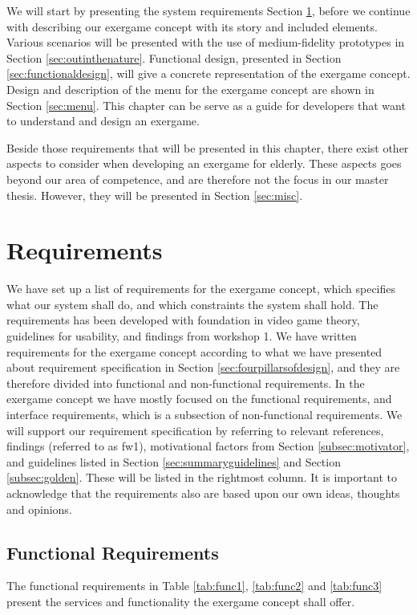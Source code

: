 We will start by presenting the system requirements Section \ref{sec:req}, before we continue with describing our exergame concept with its story and included elements. Various scenarios will be presented with the use of medium-fidelity prototypes in Section \ref{sec:outinthenature}. Functional design, presented in Section \ref{sec:functionaldesign}, will give a concrete representation of the exergame concept. Design and description of the menu for the exergame concept are shown in Section \ref{sec:menu}. This chapter can be serve as a guide for developers that want to understand and design an exergame. 

Beside those requirements that will be presented in this chapter, there exist other aspects to consider when developing an exergame for elderly. These aspects goes beyond our area of competence, and are therefore not the focus in our master thesis. However, they will be presented in Section \ref{sec:misc}.

\section{Requirements}
\label{sec:req}
We have set up a list of requirements for the exergame concept, which specifies what our system shall do, and which constraints the system shall hold. The requirements has been developed with foundation in video game theory, guidelines for usability, and findings from workshop 1. We have written requirements for the exergame concept according to what we have presented about requirement specification in Section \ref{sec:fourpillarsofdesign}, and they are therefore divided into functional and non-functional requirements. In the exergame concept we have mostly focused on the functional requirements, and interface requirements, which is a subsection of non-functional requirements. We will support our requirement specification by referring to relevant references, findings (referred to as fw1), motivational factors from Section \ref{subsec:motivator}, and guidelines listed in Section \ref{sec:summaryguidelines} and Section \ref{subsec:golden}. These will be listed in the rightmost column. It is important to acknowledge that the requirements also are based upon our own ideas, thoughts and opinions. 

\subsection{Functional Requirements}
The functional requirements in Table \ref{tab:func1}, \ref{tab:func2} and \ref{tab:func3} present the services and functionality the exergame concept shall offer.


